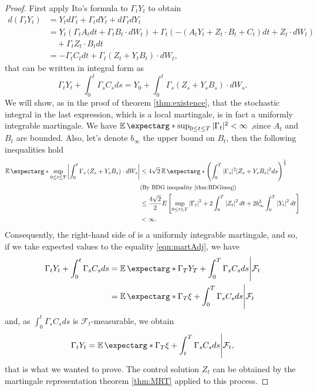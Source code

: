 \begin{proof}
	First apply Ito's formula to $\Gamma_t Y_t$ to obtain
	\begin{equation}
		\begin{split}
			d(\Gamma_t Y_t)&=Y_t d\Gamma_t +\Gamma_t dY_t +d\Gamma_t dY_t\\
			&=Y_t(\Gamma_t A_t dt +\Gamma_t B_t\cdot dW_t)+\Gamma_t(-(A_tY_t+Z_t\cdot B_t+C_t)dt+Z_t\cdot dW_t)\\
			& \quad+\Gamma_t Z_t \cdot B_t dt\\
			&=-\Gamma_t C_t dt+\Gamma_t (Z_t+Y_t B_t)\cdot dW_t,
		\end{split}
	\end{equation}
that can be written in integral form as 
\begin{equation}
	\label{eqn:martAdj}
	\Gamma_t Y_t+\int_0^t \Gamma_s C_s d s=Y_0+\int_0^t \Gamma_s\left(Z_s+Y_s B_s\right) \cdot d W_s.
\end{equation}
We will show, as in the proof of theorem \ref{thm:existence}, that the stochastic integral  in the last expression, which is a local martingale, is in fact a uniformly integrable martingale. We have $\expect*{\sup_{0\leq t \leq T}|\Gamma_t|^2}<\infty$ ,since $A_t$ and $B_t$ are bounded. Also, let's denote $b_\infty$ the upper bound on $B_t$, then the following inequalities hold 
\begin{equation}
	\begin{split}
		\expect*{\sup_{0\leq t \leq T}\left|\int_0^t \Gamma_s\left(Z_s+Y_s B_s\right) \cdot d W_s\right|}&\leq 4\sqrt{2} \expect*{\left(\int_{0}^{T}|\Gamma_s|^2 |Z_s+Y_s B_s|^2 ds\right)^{\frac{1}{2}}} \\
		&\text{{\small (By BDG inequality \ref{thm:BDGineq})}}\\
		& \leq \frac{4\sqrt{2}}{2} E\left[\sup_{0\leq t \leq T}\left|\Gamma_t\right|^2+2 \int_0^T\left|Z_t\right|^2 d t+2 b_{\infty}^2 \int_0^T\left|Y_t\right|^2 d t\right]\\
		&<\infty.
	\end{split}
\end{equation}
Consequently, the right-hand side of is a uniformly integrable martingale, and so, if we take expected values to the equality \eqref{eqn:martAdj}, we have
\begin{equation}
	\begin{split}
		\Gamma_t Y_t+\int_0^t \Gamma_s C_s d s & =\expect*{\Gamma_T Y_T+\int_0^T \Gamma_s C_s d s \Bigg| \mathcal{F}_t} \\
		& =\expect*{\Gamma_T \xi+\int_0^T \Gamma_s C_s d s \Bigg| \mathcal{F}_t}
	\end{split}
\end{equation} 
and, as $\int_0^t \Gamma_s C_s d s$ is $\mathcal{F}_t$-measurable, we obtain
\begin{equation}
		\Gamma_t Y_t =\expect*{\Gamma_T \xi+\int_t^T \Gamma_s C_s d s \Bigg| \mathcal{F}_t},
\end{equation}
that is what we wanted to prove. The control solution $Z_t$ can be obtained by the martingale representation theorem \ref{thm:MRT} applied to this process.
\end{proof}


